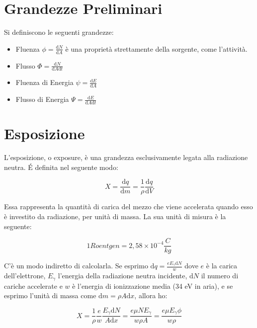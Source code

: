 \section{Grandezze Preliminari}

Si definiscono le seguenti grandezze:

\begin{itemize}
\item Fluenza $\phi=\frac{\mathrm{d}N}{\mathrm{d}A}$ è una proprietà strettamente della sorgente, come l'attività.
\item Flusso $\Phi=\frac{\mathrm{d}N}{\mathrm{d}A\mathrm{d}t}$
\item Fluenza di Energia $\psi=\frac{\mathrm{d}E}{\mathrm{d}A}$
\item Flusso di Energia $\Psi=\frac{\mathrm{d}E}{\mathrm{d}A\mathrm{d}t}$
\end{itemize}

\section{Esposizione}

L'esposizione, o exposure, è una grandezza esclusivamente legata alla radiazione neutra. \'E definita nel seguente modo:

\begin{equation}
X=\frac{\mathrm{d}q}{\mathrm{d}m}=\frac{1}{\rho}\frac{\mathrm{d}q}{\mathrm{d}V}
\end{equation}

Essa rappresenta la quantità di carica del mezzo che viene accelerata quando esso è investito da radiazione, per unità di massa. La sua unità di misura è la seguente:

\begin{equation}
1 Roentgen = 2,58 \times 10^{-4} \frac{C}{kg}
\end{equation}

C'è un modo indiretto di calcolarla. Se esprimo $\mathrm{d}q=\frac{eE_{\gamma}\mathrm{d}N }{w}$ dove $e$ è la carica dell'elettrone, $E_{\gamma}$ l'energia della radiazione neutra incidente, $\mathrm{d}N$ il numero di cariche accelerate e $w$ è l'energia di ionizzazione media (34 eV in aria), e se esprimo l'unità di massa come $\mathrm{d}m=\rho A \mathrm{d}x$, allora ho:

\begin{equation}
X=\frac{1}{\rho}\frac{e}{w}\frac{E_{\gamma}\mathrm{d}N}{A  \mathrm{d}x}=\frac{e  \mu  N E_{\gamma} }{ w  \rho A}=\frac{e \mu E_{\gamma} \phi}{w \rho}
\end{equation}

